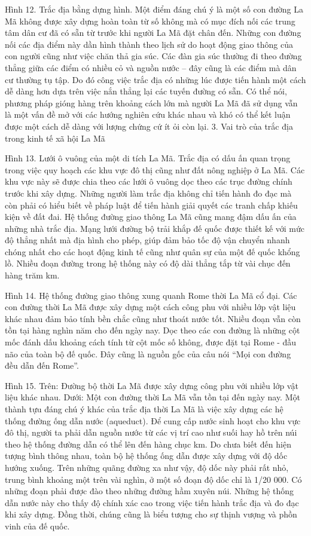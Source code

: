 \begin{multicols}{2}
	Hình 12. Trắc địa bằng dựng hình.
	Một điểm đáng chú ý là một số con đường La Mã không được xây dựng hoàn toàn từ số không mà có mục đích nối các trung tâm dân cư đã có sẵn từ trước khi người La Mã đặt chân đến. Những con đường nối các địa điểm này dần hình thành theo lịch sử do hoạt động giao thông của con người cũng như việc chăn thả gia súc. Các đàn gia súc thường đi theo đường thẳng giữa các điểm có nhiều cỏ và nguồn nước – đây cũng là các điểm mà dân cư thường tụ tập. Do đó công việc trắc địa có những lúc được tiến hành một cách dễ dàng hơn dựa trên việc nắn thẳng lại các tuyến đường có sẵn.
	Có thể nói, phương pháp gióng hàng trên khoảng cách lớn mà người La Mã đã sử dụng vẫn là một vấn đề mở với các hướng nghiên cứu khác nhau và khó có thể kết luận được một cách dễ dàng với lượng chứng cứ ít ỏi còn lại.
	3. Vai trò của trắc địa trong kinh tế xã hội La Mã
	
	Hình 13. Lưới ô vuông của một di tích La Mã.
	Trắc địa có dấu ấn quan trọng trong việc quy hoạch các khu vực đô thị cũng như đất nông nghiệp ở La Mã. Các khu vực này sẽ được chia theo các lưới ô vuông dọc theo các trục đường chính trước khi xây dựng. Những người làm trắc địa không chỉ tiến hành đo đạc mà còn phải có hiểu biết về pháp luật để tiến hành giải quyết các tranh chấp khiếu kiện về đất đai.
	Hệ thống đường giao thông La Mã cũng mang đậm dấu ấn của những nhà trắc địa. Mạng lưới đường bộ trải khắp đế quốc được thiết kế với mức độ thẳng nhất mà địa hình cho phép, giúp đảm bảo tốc độ vận chuyển nhanh chóng nhất cho các hoạt động kinh tế cũng như quân sự của một đế quốc khổng lồ. Nhiều đoạn đường trong hệ thống này có độ dài thẳng tắp từ vài chục đến hàng trăm km.
	
	Hình 14. Hệ thống đường giao thông xung quanh Rome thời La Mã cổ đại.
	Các con đường thời La Mã được xây dựng một cách công phu với nhiều lớp vật liệu khác nhau đảm bảo tính bền chắc cũng như thoát nước tốt. Nhiều đoạn vẫn còn tồn tại hàng nghìn năm cho đến ngày nay. Dọc theo các con đường là những cột mốc đánh dấu khoảng cách tính từ cột mốc số không, được đặt tại Rome - đầu não của toàn bộ đế quốc. Đây cũng là nguồn gốc của câu nói “Mọi con đường đều dẫn đến Rome”.
	
	Hình 15. Trên: Đường bộ thời La Mã được xây dựng công phu với nhiều lớp vật liệu khác nhau. Dưới: Một con đường thời La Mã vẫn tồn tại đến ngày nay.
	Một thành tựu đáng chú ý khác của trắc địa thời La Mã là việc xây dựng các hệ thống đường ống dẫn nước (aqueduct). Để cung cấp nước sinh hoạt cho khu vực đô thị, người ta phải dẫn nguồn nước từ các vị trí cao như suối hay hồ trên núi theo hệ thống đường dẫn có thể lên đến hàng chục km. Do chưa biết đến hiện tượng bình thông nhau, toàn bộ hệ thống ống dẫn được xây dựng với độ dốc hướng xuống. Trên những quãng đường xa như vậy, độ dốc này phải rất nhỏ, trung bình khoảng một trên vài nghìn, ở một số đoạn độ dốc chỉ là 1/20 000. Có những đoạn phải được đào theo những đường hầm xuyên núi. Những hệ thống dẫn nước này cho thấy độ chính xác cao trong việc tiến hành trắc địa và đo đạc khi xây dựng. Đồng thời, chúng cũng là biểu tượng cho sự thịnh vượng và phồn vinh của đế quốc.
	

\end{multicols}
